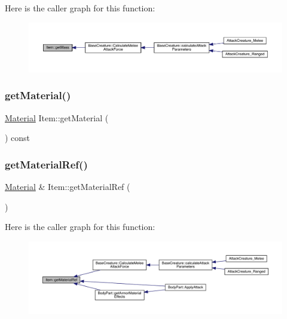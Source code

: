 Here is the caller graph for this function\+:
\nopagebreak
\begin{figure}[H]
\begin{center}
\leavevmode
\includegraphics[width=350pt]{dc/d32/class_item_a452c0983b99f1b148949274b63ed79fd_icgraph}
\end{center}
\end{figure}
\mbox{\label{class_item_ada6692d4e0e9e8f9a9a78a13fd6522d8}} 
\subsubsection{\texorpdfstring{get\+Material()}{getMaterial()}}
{\footnotesize\ttfamily \mbox{\hyperlink{class_material}{Material}} Item\+::get\+Material (\begin{DoxyParamCaption}{ }\end{DoxyParamCaption}) const}

\mbox{\label{class_item_af22ec5d207b70e2a3359e76dccfc7e11}} 
\subsubsection{\texorpdfstring{get\+Material\+Ref()}{getMaterialRef()}}
{\footnotesize\ttfamily \mbox{\hyperlink{class_material}{Material}} \& Item\+::get\+Material\+Ref (\begin{DoxyParamCaption}{ }\end{DoxyParamCaption})}

Here is the caller graph for this function\+:
\nopagebreak
\begin{figure}[H]
\begin{center}
\leavevmode
\includegraphics[width=350pt]{dc/d32/class_item_af22ec5d207b70e2a3359e76dccfc7e11_icgraph}
\end{center}
\end{figure}
\mbox{\label{class_item_ac8e94ab96931949a517490d1c4b37287}} 
